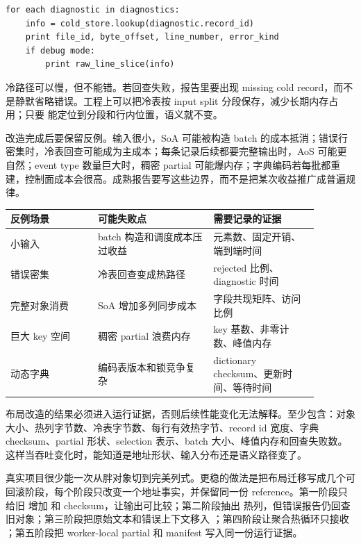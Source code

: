 \begin{lstlisting}[numbers=none,caption={诊断回查的语义伪代码}]
for each diagnostic in diagnostics:
    info = cold_store.lookup(diagnostic.record_id)
    print file_id, byte_offset, line_number, error_kind
    if debug mode:
        print raw_line_slice(info)
\end{lstlisting}

冷路径可以慢，但不能错。若回查失败，报告里要出现 missing cold record，而不是静默省略错误。工程上可以把冷表按 input split 分段保存，减少长期内存占用；只要  能定位到分段和行内位置，语义就不变。

改造完成后要保留反例。输入很小，SoA 可能被构造 batch 的成本抵消；错误行密集时，冷表回查可能成为主成本；每条记录后续都要完整输出时，AoS 可能更自然；event type 数量巨大时，稠密 partial 可能爆内存；字典编码若每批都重建，控制面成本会很高。成熟报告要写这些边界，而不是把某次收益推广成普遍规律。

\begin{center}
\begin{tabular}{p{0.25\linewidth}p{0.33\linewidth}p{0.30\linewidth}}
\toprule
反例场景 & 可能失败点 & 需要记录的证据 \\
\midrule
小输入 & batch 构造和调度成本压过收益 & 元素数、固定开销、端到端时间 \\
错误密集 & 冷表回查变成热路径 & rejected 比例、diagnostic 时间 \\
完整对象消费 & SoA 增加多列同步成本 & 字段共现矩阵、访问比例 \\
巨大 key 空间 & 稠密 partial 浪费内存 & key 基数、非零计数、峰值内存 \\
动态字典 & 编码表版本和锁竞争复杂 & dictionary checksum、更新时间、等待时间 \\
\bottomrule
\end{tabular}
\end{center}

布局改造的结果必须进入运行证据，否则后续性能变化无法解释。至少包含：对象大小、热列字节数、冷表字节数、每行有效热字节、record id 宽度、字典 checksum、partial 形状、selection 表示、batch 大小、峰值内存和回查失败数。这样当吞吐变化时，能知道是地址形状、输入分布还是语义路径变了。

真实项目很少能一次从胖对象切到完美列式。更稳的做法是把布局迁移写成几个可回滚阶段，每个阶段只改变一个地址事实，并保留同一份 reference。第一阶段只给旧  增加  和 checksum，让输出可比较；第二阶段抽出  热列，但错误报告仍回查旧对象；第三阶段把原始文本和错误上下文移入 ；第四阶段让聚合热循环只接收 ；第五阶段把 worker-local partial 和 manifest 写入同一份运行证据。

